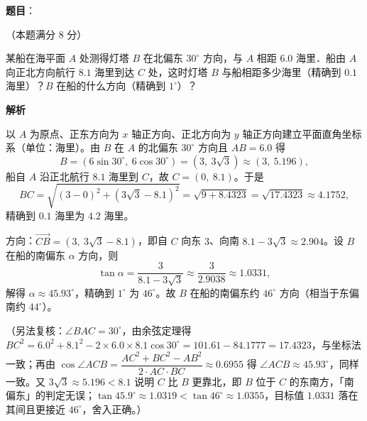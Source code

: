 \begin{answer}

\textbf{题目}：

（本题满分 8 分）

某船在海平面 \(A\) 处测得灯塔 \(B\) 在北偏东 \(30^{\circ}\) 方向，与 \(A\) 相距 \(6.0\) 海里．船由 \(A\) 向正北方向航行 \(8.1\) 海里到达 \(C\) 处，这时灯塔 \(B\) 与船相距多少海里（精确到 \(0.1\) 海里）？\(B\) 在船的什么方向（精确到 \(1^{\circ}\)）？

\textbf{解析}

以 \(A\) 为原点、正东方向为 \(x\) 轴正方向、正北方向为 \(y\) 轴正方向建立平面直角坐标系（单位：海里）。由 \(B\) 在 \(A\) 的北偏东 \(30^{\circ}\) 方向且 \(AB=6.0\) 得
\nopagebreak[4]
\[
B=(6\sin30^{\circ},\ 6\cos30^{\circ})=(3,\ 3\sqrt{3})\approx(3,\ 5.196),
\]
船自 \(A\) 沿正北航行 \(8.1\) 海里到 \(C\)，故 \(C=(0,\ 8.1)\)。于是
\nopagebreak[4]
\[
BC=\sqrt{(3-0)^{2}+(3\sqrt{3}-8.1)^{2}}=\sqrt{9+8.4323}=\sqrt{17.4323}\approx4.1752,
\]
精确到 \(0.1\) 海里为 \(4.2\) 海里。

方向：\(\overrightarrow{CB}=(3,\ 3\sqrt{3}-8.1)\)，即自 \(C\) 向东 \(3\)、向南 \(8.1-3\sqrt{3}\approx2.904\)。设 \(B\) 在船的南偏东 \(\alpha\) 方向，则
\nopagebreak[4]
\[
\tan\alpha=\frac{3}{8.1-3\sqrt{3}}\approx\frac{3}{2.9038}\approx1.0331,
\]
解得 \(\alpha\approx45.93^{\circ}\)，精确到 \(1^{\circ}\) 为 \(46^{\circ}\)。故 \(B\) 在船的南偏东约 \(46^{\circ}\) 方向（相当于东偏南约 \(44^{\circ}\)）。

（另法复核：\(\angle BAC=30^{\circ}\)，由余弦定理得 \(BC^{2}=6.0^{2}+8.1^{2}-2\times6.0\times8.1\cos30^{\circ}=101.61-84.1777=17.4323\)，与坐标法一致；再由 \(\cos\angle ACB=\dfrac{AC^{2}+BC^{2}-AB^{2}}{2\cdot AC\cdot BC}\approx0.6955\) 得 \(\angle ACB\approx45.93^{\circ}\)，同样一致。又 \(3\sqrt{3}\approx5.196<8.1\) 说明 \(C\) 比 \(B\) 更靠北，即 \(B\) 位于 \(C\) 的东南方，「南偏东」的判定无误；\(\tan45.9^{\circ}\approx1.0319<\tan46^{\circ}\approx1.0355\)，目标值 \(1.0331\) 落在其间且更接近 \(46^{\circ}\)，舍入正确。）


\end{answer}
